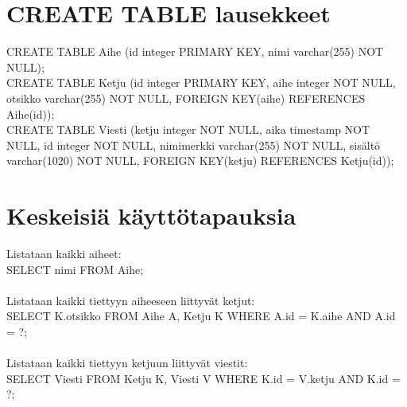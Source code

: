 \documentclass[12pt,a4paper]{article}
\begin{document}
\section{CREATE TABLE lausekkeet}
CREATE TABLE Aihe (id integer PRIMARY KEY, nimi varchar(255) NOT NULL); \\
CREATE TABLE Ketju (id integer PRIMARY KEY, aihe integer NOT NULL, otsikko varchar(255) NOT NULL, FOREIGN KEY(aihe) REFERENCES Aihe(id)); \\
CREATE TABLE Viesti (ketju integer NOT NULL, aika timestamp NOT NULL, id integer NOT NULL, nimimerkki varchar(255) NOT NULL, sisältö varchar(1020) NOT NULL, FOREIGN KEY(ketju) REFERENCES Ketju(id));
\section{Keskeisiä käyttötapauksia}
Listataan kaikki aiheet: \\
SELECT nimi FROM Aihe; \\\\
Listataan kaikki tiettyyn aiheeseen liittyvät ketjut: \\
SELECT K.otsikko FROM Aihe A, Ketju K WHERE A.id = K.aihe AND A.id = ?; \\\\
Listataan kaikki tiettyyn ketjuun liittyvät viestit: \\
SELECT Viesti FROM Ketju K, Viesti V WHERE K.id = V.ketju AND K.id = ?;
\end{document}
